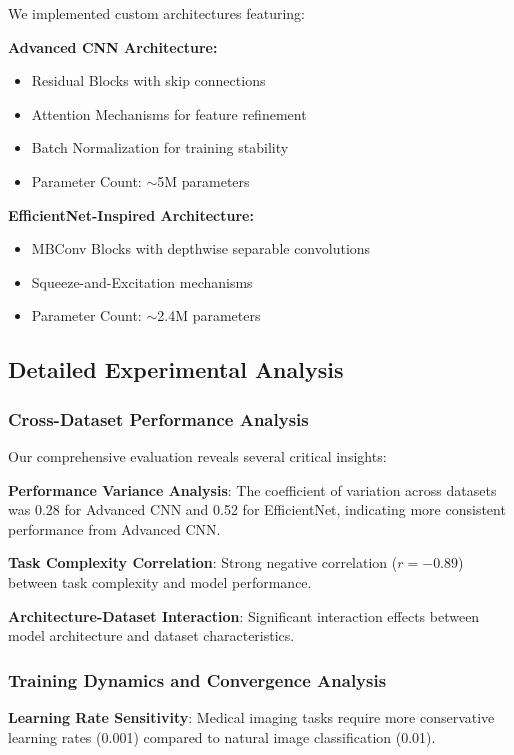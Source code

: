 \documentclass[12pt,a4paper]{article}
\begin{document}
We implemented custom architectures featuring:

\textbf{Advanced CNN Architecture:}
\begin{itemize}
    \item Residual Blocks with skip connections
    \item Attention Mechanisms for feature refinement
    \item Batch Normalization for training stability
    \item Parameter Count: $\sim$5M parameters
\end{itemize}

\textbf{EfficientNet-Inspired Architecture:}
\begin{itemize}
    \item MBConv Blocks with depthwise separable convolutions
    \item Squeeze-and-Excitation mechanisms
    \item Parameter Count: $\sim$2.4M parameters
\end{itemize}

\subsection{Detailed Experimental Analysis}

\subsubsection{Cross-Dataset Performance Analysis}

Our comprehensive evaluation reveals several critical insights:

\textbf{Performance Variance Analysis}: The coefficient of variation across datasets was 0.28 for Advanced CNN and 0.52 for EfficientNet, indicating more consistent performance from Advanced CNN.

\textbf{Task Complexity Correlation}: Strong negative correlation ($r = -0.89$) between task complexity and model performance.

\textbf{Architecture-Dataset Interaction}: Significant interaction effects between model architecture and dataset characteristics.

\subsubsection{Training Dynamics and Convergence Analysis}

\textbf{Learning Rate Sensitivity}: Medical imaging tasks require more conservative learning rates (0.001) compared to natural image classification (0.01).
\end{document}
